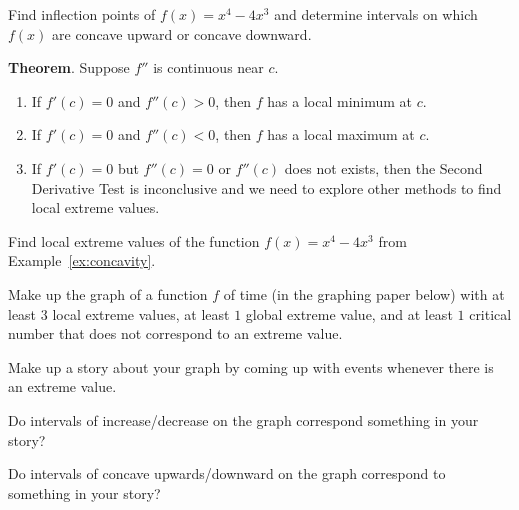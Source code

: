 \documentclass[../main.tex]{subfiles}
\begin{document}
\clearpage

\begin{example} \label{ex:concavity}
  Find inflection points of \(f(x) = x^{4} - 4x^{3}\) and determine intervals on which \(f(x)\) are concave upward or concave downward. 
\end{example}
\vfill

\begin{mdframed}[style=withref]
  \textbf{Theorem}. Suppose \(f''\) is continuous near \(c\). 
  \begin{enumerate}[label=(\alph*)]
  \item If \(f'(c) = 0\) and \(f''(c) > 0\), then \(f\) has a local minimum at \(c\).
  \item If \(f'(c) = 0\) and \(f''(c) < 0\), then \(f\) has a local maximum at \(c\).
  \item[\faExclamationTriangle{}] If \(f'(c) = 0\) but \(f''(c) = 0\) or \(f''(c)\) does not exists, then the Second Derivative Test is inconclusive and we need to explore other methods to find local extreme values.
  \end{enumerate}

\end{mdframed}

\begin{example}
  Find local extreme values of the function \(f(x) = x^{4} - 4x^{3}\) from Example~\ref{ex:concavity}.
\end{example}
\vfill
\clearpage

Make up the graph of a function \(f\) of time (in the graphing paper below) with 
at least \(3\) local extreme values,
at least \(1\) global extreme value, and
at least \(1\) critical number that does not correspond to an extreme value.

Make up a story about your graph by coming up with events whenever there is an extreme value.
\bigskip
\begin{center}
\end{center}

Do intervals of increase/decrease on the graph correspond something in your story?
\vfill

Do intervals of concave upwards/downward on the graph correspond to something in your story?
\vfill
\end{document}
